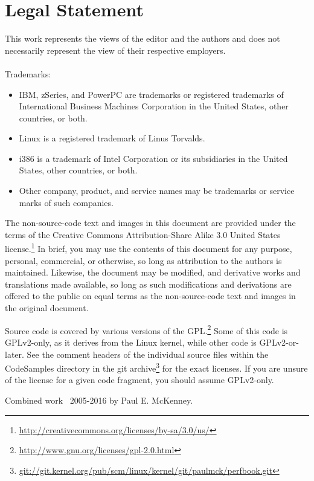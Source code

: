 
\IfTwoColumn{\onecolumn}{}

\section*{Legal Statement}

This work represents the views of the editor and the authors and does not
necessarily represent the view of their respective employers. \\
\\
Trademarks:
\begin{itemize}
\item	IBM, zSeries, and PowerPC are trademarks or registered trademarks
	of International Business Machines Corporation in the United
	States, other countries, or both.
\item	Linux is a registered trademark of Linus Torvalds.
\item	i386 is a trademark of Intel Corporation or its subsidiaries
	in the United States, other countries, or both.
\item	Other company, product, and service names may be trademarks or
	service marks of such companies.
\end{itemize}

The non-source-code text and images in this document are provided under
the terms of the Creative Commons Attribution-Share Alike 3.0 United
States license.\footnote{
	\url{http://creativecommons.org/licenses/by-sa/3.0/us/}}
In brief, you may use the contents of this document for any purpose,
personal, commercial, or otherwise, so long as attribution to the
authors is maintained.  Likewise, the document may be modified,
and derivative works and translations made available, so long as
such modifications and derivations are offered to the public on equal
terms as the non-source-code text and images in the original document.

Source code is covered by various versions of the GPL.\footnote{
	\url{http://www.gnu.org/licenses/gpl-2.0.html}}
Some of this code is GPLv2-only, as it derives from the Linux kernel,
while other code is GPLv2-or-later.
See the comment headers of the individual source files within the
CodeSamples directory in the git archive\footnote{
	\url{git://git.kernel.org/pub/scm/linux/kernel/git/paulmck/perfbook.git}}
for the exact licenses.
If you are unsure of the license for a given code fragment,
you should assume GPLv2-only.

Combined work {\textcopyright}~2005-2016 by Paul E. McKenney.

\IfTwoColumn{\twocolumn}{}
